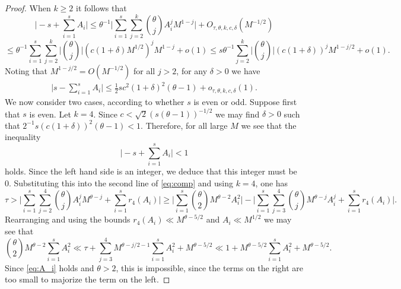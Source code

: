 \documentclass[10pt,a4paper]{amsart}
\begin{document}
\begin{proof}
When $k \geq 2$ it follows that 
\[ \Big|-s+\sum_{i=1}^s A_i\Big| \leq \theta^{-1}\Big|\sum_{i=1}^s \sum_{j=2}^k \binom{\theta}{j}A_i^jM^{1-j}\Big|+O_{\tau, \theta, k, c, \delta}(M^{-1/2}) \]
\[ \leq \theta^{-1}\sum_{i=1}^s \sum_{j=2}^k \Big|\binom{\theta}{j}\Big|(c(1+\delta)M^{1/2})^jM^{1-j}+o(1) \leq s\theta^{-1} \sum_{j=2}^k \Big| \binom{\theta}{j} \Big| (c(1+\delta))^j M^{1-j/2}+o(1). \]
Noting that $M^{1-j/2} = O(M^{-1/2})$ for all $j > 2$, for any $\delta > 0$ we have 
\begin{align} \label{eq:sA_i}
\Big|s-\sum_{i=1}^s A_i\Big| \leq \frac{1}{2}sc^2(1+\delta)^2(\theta-1)+o_{\tau, \theta, k, c, \delta}(1). 
\end{align}
We now consider two cases, according to whether $s$ is even or odd. Suppose first that $s$ is even. Let $k = 4$. 
Since $c < \sqrt{2}(s(\theta-1))^{-1/2}$ we may find $\delta > 0$ such that $2^{-1}s(c(1+\delta))^2(\theta-1) < 1$. Therefore, for all large $M$ we see that the inequality 
\[ \Big|-s+\sum_{i=1}^s A_i\Big| < 1 \]
holds. Since the left hand side is an integer, we deduce that this integer must be $0$. Substituting this into the second line of \eqref{eq:comp} and using $k = 4$, one has 
\[ \tau > \Big|\sum_{i=1}^s \sum_{j=2}^4 \binom{\theta}{j} A_i^jM^{\theta-j} +\sum_{i=1}^s r_4(A_i)\Big| \geq \Big|\sum_{i=1}^s \binom{\theta}{2}M^{\theta-2}A_i^2\Big| - \Big|\sum_{i=1}^s \sum_{j=3}^4 \binom{\theta}{j}M^{\theta-j}A_i^j+\sum_{i=1}^s r_4(A_i)\Big|. \]
Rearranging and using the bounds $r_4(A_i) \ll M^{\theta-5/2}$ and $A_i \ll M^{1/2}$ we may see that 
\[ \binom{\theta}{2}M^{\theta-2}\sum_{i=1}^s A_i^2 \ll \tau + \sum_{j=3}^4 M^{\theta-j/2-1}\sum_{i=1}^s A_i^2+M^{\theta-5/2} \ll 1 +M^{\theta-5/2}\sum_{i=1}^s A_i^2+M^{\theta-5/2} . \]
Since \eqref{eq:A_i} holds and $\theta > 2$, this is impossible, since the terms on the right are too small to majorize the term on the left.  


\end{proof}
\end{document}
